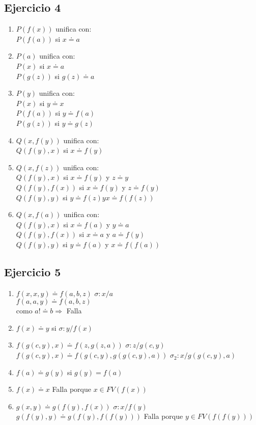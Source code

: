 \documentclass[10pt,a4paper]{article}
\begin{document}
  \subsection{Ejercicio 4}
    \begin{enumerate}
    \item $P(f(x)) $ unifica con: \\
    $P(f(a)) $ si $ x \doteq a$
    \item $P(a) $ unifica con: \\
    $P(x) $ si $ x \doteq a$ \\
    $P(g(z)) $ si $ g(z) \doteq a$
    \item $P(y) $ unifica con: \\
    $P(x) $ si $ y \doteq x$ \\
    $P(f(a)) $ si $ y \doteq f(a)$ \\
    $P(g(z)) $ si $ y \doteq g(z)$
    \item $Q(x,f(y)) $ unifica con: \\
    $Q(f(y),x) $ si $ x \doteq f(y)$
    \item $Q(x,f(z)) $ unifica con: \\
    $Q(f(y),x) $ si $ x \doteq f(y) $ y $ z \doteq y$ \\
    $Q(f(y),f(x)) $ si $ x \doteq f(y) $ y $ z \doteq f(y)$ \\
    $Q(f(y),y) $ si $ y \doteq f(z) y x \doteq f(f(z))$
    \item $Q(x,f(a)) $ unifica con: \\
    $Q(f(y),x) $ si $ x \doteq f(a) $ y $ y \doteq a$ \\
    $Q(f(y),f(x)) $ si $ x \doteq a $ y $ a \doteq f(y)$ \\
    $Q(f(y),y) $ si $ y \doteq f(a) $ y $ x \doteq f(f(a))$
    \end{enumerate}
  \subsection{Ejercicio 5}
    \begin{enumerate}
    \item $f(x,x,y) \doteq f(a,b,z)$ $\sigma:{x/a}$ \\
    $f(a,a,y) \doteq f(a,b,z)$ \\
    como $a ! \doteq b \Rightarrow$ Falla 
    \item $f(x) \doteq y$ si $\sigma:{y/f(x)}$
    \item $f(g(c,y),x) \doteq f(z,g(z,a))$ $\sigma:{z/g(c,y)}$
    $f(g(c,y),x) \doteq f(g(c,y),g(g(c,y),a))$ $\sigma_{2}:{x/g(g(c,y),a)}$
    \item $f(a) \doteq g(y)$ si $g(y)=f(a)$
    \item $f(x) \doteq x$ Falla porque $x \in FV(f(x))$
    \item $g(x,y) \doteq g(f(y),f(x))$ $\sigma:{x/f(y)}$
     $g(f(y),y) \doteq g(f(y),f(f(y)))$ Falla porque $y \in FV(f(f(y)))$
    \end{enumerate}
\end{document}
